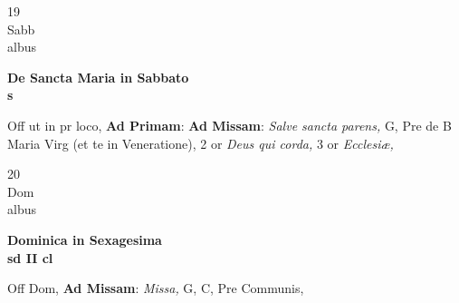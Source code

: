 \documentclass[10pt, openany]{book}
\begin{document}
        \begin{center}
            \begin{minipage}{3.5in}
                \vspace{2em}
                \begin{minipage}{0.5in}
                    {\Huge 19} \\
                    {\normalsize Sabb} \\
                    {\normalsize albus}
                \end{minipage}
                \begin{minipage}{3.0in}
                    \textbf{ \large De Sancta Maria in Sabbato \\
                    \textnormal{\normalsize s}} \\ 
                \end{minipage}
                \begin{justify}Off ut in pr loco, \textbf{Ad Primam}: \textbf{Ad Missam}: \textit{Salve sancta parens,} G, Pre de B Maria Virg (et te in Veneratione), 2 or \textit{Deus qui corda,} 3 or \textit{Ecclesiæ,}  
                \end{justify}
            \end{minipage}
        \end{center}
    
        \begin{center}
            \begin{minipage}{3.5in}
                \vspace{2em}
                \begin{minipage}{0.5in}
                    {\Huge 20} \\
                    {\normalsize Dom} \\
                    {\normalsize albus}
                \end{minipage}
                \begin{minipage}{3.0in}
                    \textbf{ \large Dominica in Sexagesima \\
                    \textnormal{\normalsize sd II cl}} \\ 
                \end{minipage}
                \begin{justify}Off Dom, \textbf{Ad Missam}: \textit{Missa,} G, C, Pre Communis,  
                \end{justify}
            \end{minipage}
        \end{center}
    
\end{document}
